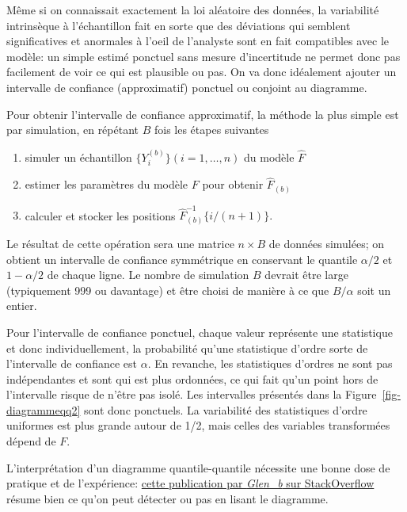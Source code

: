 \documentclass[
  11pt,
  letterpaper,
]{scrbook}
\providecommand{\tightlist}{%
  \setlength{\itemsep}{0pt}\setlength{\parskip}{0pt}}\usepackage{longtable,booktabs,array}
\theoremstyle{plain}
\theoremstyle{plain}
\theoremstyle{definition}
\theoremstyle{definition}
\theoremstyle{remark}
\begin{document}
Même si on connaissait exactement la loi aléatoire des données, la
variabilité intrinsèque à l'échantillon fait en sorte que des déviations
qui semblent significatives et anormales à l'oeil de l'analyste sont en
fait compatibles avec le modèle: un simple estimé ponctuel sans mesure
d'incertitude ne permet donc pas facilement de voir ce qui est plausible
ou pas. On va donc idéalement ajouter un intervalle de confiance
(approximatif) ponctuel ou conjoint au diagramme.

Pour obtenir l'intervalle de confiance approximatif, la méthode la plus
simple est par simulation, en répétant \(B\) fois les étapes suivantes

\begin{enumerate}
\def\labelenumi{\arabic{enumi}.}
\tightlist
\item
  simuler un échantillon \(\{Y^{(b)}_{i}\} (i=1,\ldots, n)\) du modèle
  \(\widehat{F}\)
\item
  estimer les paramètres du modèle \(F\) pour obtenir
  \(\widehat{F}_{(b)}\)
\item
  calculer et stocker les positions
  \(\widehat{F}^{-1}_{(b)}\{i/(n+1)\}.\)
\end{enumerate}

Le résultat de cette opération sera une matrice \(n \times B\) de
données simulées; on obtient un intervalle de confiance symmétrique en
conservant le quantile \(\alpha/2\) et \(1-\alpha/2\) de chaque ligne.
Le nombre de simulation \(B\) devrait être large (typiquement 999 ou
davantage) et être choisi de manière à ce que \(B/\alpha\) soit un
entier.

Pour l'intervalle de confiance ponctuel, chaque valeur représente une
statistique et donc individuellement, la probabilité qu'une statistique
d'ordre sorte de l'intervalle de confiance est \(\alpha.\) En revanche,
les statistiques d'ordres ne sont pas indépendantes et sont qui est plus
ordonnées, ce qui fait qu'un point hors de l'intervalle risque de n'être
pas isolé. Les intervalles présentés dans la
Figure~\ref{fig-diagrammeqq2} sont donc ponctuels. La variabilité des
statistiques d'ordre uniformes est plus grande autour de 1/2, mais
celles des variables transformées dépend de \(F.\)

L'interprétation d'un diagramme quantile-quantile nécessite une bonne
dose de pratique et de l'expérience:
\href{https://stats.stackexchange.com/questions/101274/how-to-interpret-a-qq-plot/101290\#101290}{cette
publication par \emph{Glen\_b} sur StackOverflow} résume bien ce qu'on
peut détecter ou pas en lisant le diagramme.
\end{document}
